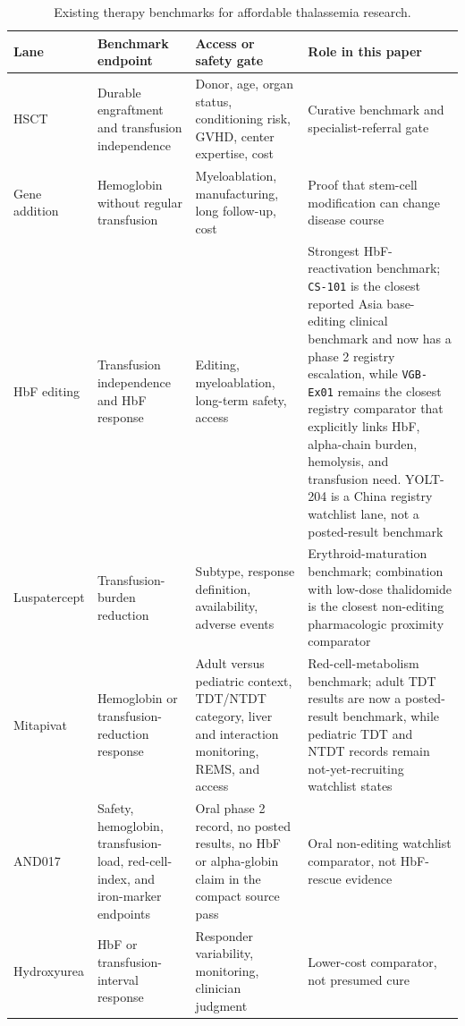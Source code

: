 \begin{table}[htbp]
\centering
\small
\caption{Existing therapy benchmarks for affordable thalassemia research.}
\label{tab:therapy-benchmark}
\begin{tabularx}{\textwidth}{@{}L{0.20\textwidth}Y Y Y@{}}
\toprule
Lane & Benchmark endpoint & Access or safety gate & Role in this paper \\
\midrule
HSCT & Durable engraftment and transfusion independence & Donor, age, organ
status, conditioning risk, GVHD, center expertise, cost & Curative benchmark
and specialist-referral gate \\
Gene addition & Hemoglobin without regular transfusion & Myeloablation,
manufacturing, long follow-up, cost & Proof that stem-cell modification can
change disease course \\
HbF editing & Transfusion independence and HbF response & Editing,
myeloablation, long-term safety, access & Strongest HbF-reactivation benchmark;
\texttt{CS-101} is the closest reported Asia base-editing clinical benchmark
and now has a phase 2 registry escalation, while \texttt{VGB-Ex01} remains the
closest registry comparator that explicitly links HbF, alpha-chain burden,
hemolysis, and transfusion need. YOLT-204 is a China registry watchlist lane,
not a posted-result benchmark
\cite{lai2026cs101BaseEditing,clinicaltrials2026cs101,clinicaltrials2026cs101Phase2,clinicaltrials2026vgbEx01,clinicaltrials2026yolt204Tdt,clinicaltrials2026yolt204Hemoglobinopathies,locatelli2024exaCel} \\
Luspatercept & Transfusion-burden reduction & Subtype, response definition,
availability, adverse events & Erythroid-maturation benchmark; combination
with low-dose thalidomide is the closest non-editing pharmacologic proximity
comparator
\cite{cappellini2020luspatercept,clinicaltrials2026luspaterceptThalidomide} \\
Mitapivat & Hemoglobin or transfusion-reduction response & Adult versus
pediatric context, TDT/NTDT category, liver and interaction monitoring, REMS,
and access & Red-cell-metabolism benchmark; adult TDT results are now a
posted-result benchmark, while pediatric TDT and NTDT records remain
not-yet-recruiting watchlist states
\cite{taher2025energize,fda2025aqvesme,clinicaltrials2026energizeT,clinicaltrials2026mitapivatPediatricTdt,clinicaltrials2026mitapivatPediatricNtdt} \\
AND017 & Safety, hemoglobin, transfusion-load, red-cell-index, and iron-marker
endpoints & Oral phase 2 record, no posted results, no HbF or alpha-globin
claim in the compact source pass & Oral non-editing watchlist comparator, not
HbF-rescue evidence \cite{clinicaltrials2026and017} \\
Hydroxyurea & HbF or transfusion-interval response & Responder variability,
monitoring, clinician judgment & Lower-cost comparator, not presumed cure
\cite{tdtHydroxyurea2023} \\
\bottomrule
\end{tabularx}
\end{table}
